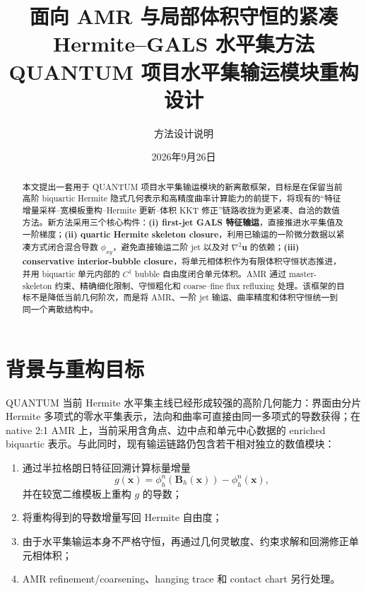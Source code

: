 \documentclass[11pt,a4paper]{ctexart}
\title{\textbf{面向 AMR 与局部体积守恒的紧凑 Hermite--GALS 水平集方法}\\[0.4em]
\large QUANTUM 项目水平集输运模块重构设计}
\author{方法设计说明}
\date{2026年9月26日}
\newcommand{\bx}{\bm{x}}
\newcommand{\bu}{\bm{u}}
\newcommand{\bB}{\bm{B}}
\begin{document}
\maketitle

\begin{abstract}
本文提出一套用于 QUANTUM 项目水平集输运模块的新离散框架，目标是在保留当前高阶 biquartic Hermite 隐式几何表示和高精度曲率计算能力的前提下，将现有的“特征增量采样--宽模板重构--Hermite 更新--体积 KKT 修正”链路收拢为更紧凑、自洽的数值方法。新方法采用三个核心构件：\textbf{(i) first-jet GALS 特征输运}，直接推进水平集值及一阶梯度；\textbf{(ii) quartic Hermite skeleton closure}，利用已输运的一阶微分数据以紧凑方式闭合混合导数 $\phi_{xy}$，避免直接输运二阶 jet 以及对 $\nabla^2\bu$ 的依赖；\textbf{(iii) conservative interior-bubble closure}，将单元相体积作为有限体积守恒状态推进，并用 biquartic 单元内部的 $C^1$ bubble 自由度闭合单元体积。AMR 通过 master-skeleton 约束、精确细化限制、守恒粗化和 coarse--fine flux refluxing 处理。该框架的目标不是降低当前几何阶次，而是将 AMR、一阶 jet 输运、曲率精度和体积守恒统一到同一个离散结构中。
\end{abstract}

\tableofcontents
\newpage

\section{背景与重构目标}

QUANTUM 当前 Hermite 水平集主线已经形成较强的高阶几何能力：界面由分片 Hermite 多项式的零水平集表示，法向和曲率可直接由同一多项式的导数获得；在 native 2:1 AMR 上，当前采用含角点、边中点和单元中心数据的 enriched biquartic 表示。与此同时，现有输运链路仍包含若干相对独立的数值模块：
\begin{enumerate}
    \item 通过半拉格朗日特征回溯计算标量增量
    \[
        g(\bx)=\phi_h^n(\bB_h(\bx))-\phi_h^n(\bx),
    \]
    并在较宽二维模板上重构 $g$ 的导数；
    \item 将重构得到的导数增量写回 Hermite 自由度；
    \item 由于水平集输运本身不严格守恒，再通过几何灵敏度、约束求解和回溯修正单元相体积；
    \item AMR refinement/coarsening、hanging trace 和 contact chart 另行处理。
\end{enumerate}
\end{document}
